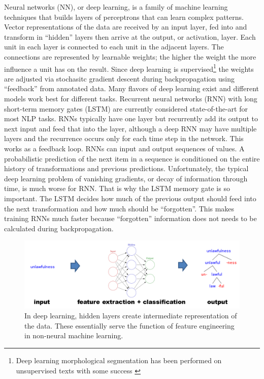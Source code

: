 \documentclass[12pt]{article}
\begin{document}
  Neural networks (NN), or deep learning, is a family of machine learning techniques that builds layers of perceptrons that can learn complex patterns. Vector representations of the data are received by an input layer, fed into and transform in ``hidden'' layers then arrive at the output, or activation, layer.  Each unit in each layer is connected to each unit in the adjacent layers. The connections are represented by learnable weights; the higher the weight the more influence a unit has on the result. Since deep learning is supervised\footnote{Deep learning morphological segmentation has been performed on unsupervised texts with some success \cite{wang_morphological_2016}} the weights are adjusted via stochasitc gradient descent during backpropagation using ``feedback'' from annotated data. Many flavors of deep learning exist and different models work best for different tasks. Recurrent neural networks (RNN) \cite{Elman91} with long short-term memory gates (LSTM) \cite{Hochreiter_1997} are currently considered state-of-the-art for most NLP tasks. RNNs typically have one layer but recurrently add its output to next input and feed that into the layer, although a deep RNN may have multiple layers and the recurrence occurs only for each time step in the network. This works as a feedback loop. RNNs can input and output sequences of values. A probabilistic prediction of the next item in a sequence is conditioned on the entire history of transformations and previous predictions. Unfortunately, the typical deep learning problem of vanishing gradients, or decay of information through time, is much worse for RNN. That is why the LSTM memory gate is so important. The LSTM decides how much of the previous output should feed into the next transformation and how much should be ``forgotten''. This makes training RNNs much faster because ``forgotten'' information does not needs to be calculated during backpropagation.

\begin{figure}[ht]
\label{fig:DL}
\begin{center}
\includegraphics[width=0.95\columnwidth]{DL.PNG}
\caption{In deep learning, hidden layers create intermediate representation of the data. These essentially serve the function of feature engineering in non-neural machine learning.}
\end{center}
\end{figure}
\end{document}
